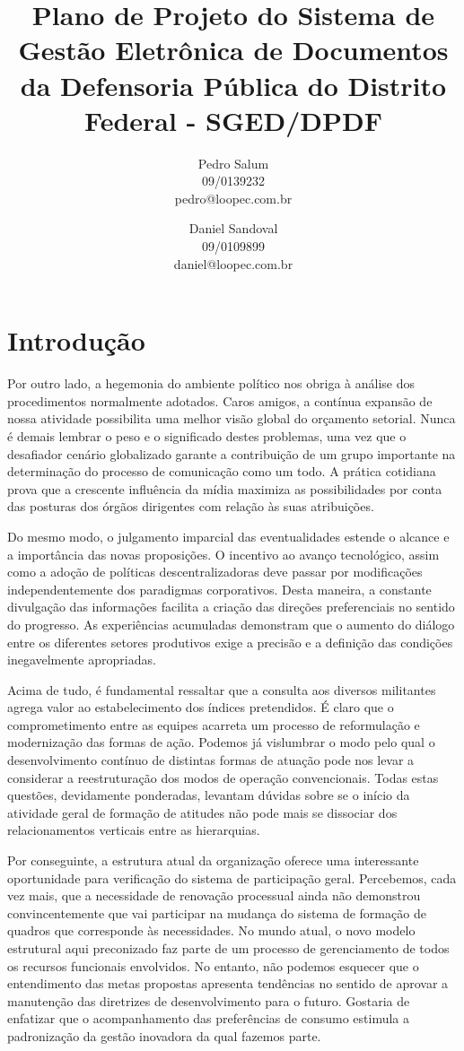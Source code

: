 \documentclass[12pt,a4paper]{report}
\title{Plano de Projeto do Sistema de Gestão Eletrônica de Documentos da Defensoria Pública do Distrito Federal - SGED/DPDF}
\author{Pedro Salum\\
	09/0139232\\
	pedro@loopec.com.br
	\and
	Daniel Sandoval\\
	09/0109899\\
	daniel@loopec.com.br}
\begin{document}
\maketitle
\tableofcontents

\chapter{Introdução}

Por outro lado, a hegemonia do ambiente político nos obriga à análise dos procedimentos normalmente adotados. Caros amigos, a contínua expansão de nossa atividade possibilita uma melhor visão global do orçamento setorial. Nunca é demais lembrar o peso e o significado destes problemas, uma vez que o desafiador cenário globalizado garante a contribuição de um grupo importante na determinação do processo de comunicação como um todo. A prática cotidiana prova que a crescente influência da mídia maximiza as possibilidades por conta das posturas dos órgãos dirigentes com relação às suas atribuições. 

Do mesmo modo, o julgamento imparcial das eventualidades estende o alcance e a importância das novas proposições. O incentivo ao avanço tecnológico, assim como a adoção de políticas descentralizadoras deve passar por modificações independentemente dos paradigmas corporativos. Desta maneira, a constante divulgação das informações facilita a criação das direções preferenciais no sentido do progresso. As experiências acumuladas demonstram que o aumento do diálogo entre os diferentes setores produtivos exige a precisão e a definição das condições inegavelmente apropriadas. 

Acima de tudo, é fundamental ressaltar que a consulta aos diversos militantes agrega valor ao estabelecimento dos índices pretendidos. É claro que o comprometimento entre as equipes acarreta um processo de reformulação e modernização das formas de ação. Podemos já vislumbrar o modo pelo qual o desenvolvimento contínuo de distintas formas de atuação pode nos levar a considerar a reestruturação dos modos de operação convencionais. Todas estas questões, devidamente ponderadas, levantam dúvidas sobre se o início da atividade geral de formação de atitudes não pode mais se dissociar dos relacionamentos verticais entre as hierarquias. 

Por conseguinte, a estrutura atual da organização oferece uma interessante oportunidade para verificação do sistema de participação geral. Percebemos, cada vez mais, que a necessidade de renovação processual ainda não demonstrou convincentemente que vai participar na mudança do sistema de formação de quadros que corresponde às necessidades. No mundo atual, o novo modelo estrutural aqui preconizado faz parte de um processo de gerenciamento de todos os recursos funcionais envolvidos. No entanto, não podemos esquecer que o entendimento das metas propostas apresenta tendências no sentido de aprovar a manutenção das diretrizes de desenvolvimento para o futuro. Gostaria de enfatizar que o acompanhamento das preferências de consumo estimula a padronização da gestão inovadora da qual fazemos parte. 
\end{document}
